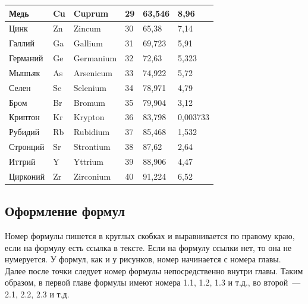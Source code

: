 \documentclass[14pt]{extarticle}
\begin{document}
\begin{longtable}{|p{}|p{}|p{}|p{}|p{}|p{}|}
	Медь & Cu & Cuprum & 29 & 63,546 & 8,96 \\ \hline
	Цинк & Zn & Zincum & 30 & 65,38 & 7,14 \\ \hline
	Галлий & Ga & Gallium & 31 & 69,723 & 5,91 \\ \hline
	Германий & Ge & Germanium & 32 & 72,63 & 5,323 \\ \hline
	Мышьяк & As & Arsenicum & 33 & 74,922 & 5,72 \\ \hline
	Селен & Se & Selenium & 34 & 78,971 & 4,79 \\ \hline
	Бром & Br & Bromum & 35 & 79,904 & 3,12 \\ \hline
	Криптон & Kr & Krypton & 36 & 83,798 & 0,003733 \\ \hline
	Рубидий & Rb & Rubidium & 37 & 85,468 & 1,532 \\ \hline
	Стронций & Sr & Strontium & 38 & 87,62 & 2,64 \\ \hline
	Иттрий & Y & Yttrium & 39 & 88,906 & 4,47 \\ \hline
	Цирконий & Zr & Zirconium & 40 & 91,224 & 6,52 \\ \hline
\end{longtable}

\subsection{Оформление формул}
Номер формулы пишется в круглых скобках и выравнивается по правому краю, если на формулу есть ссылка в тексте. Если на формулу ссылки нет, то она не нумеруется. У формул, как и у рисунков, номер начинается с номера главы. Далее после точки следует номер формулы непосредственно внутри главы. Таким образом, в первой главе формулы имеют номера 1.1, 1.2, 1.3 и т.д., во второй~--- 2.1, 2.2, 2.3 и т.д.
\end{document}
